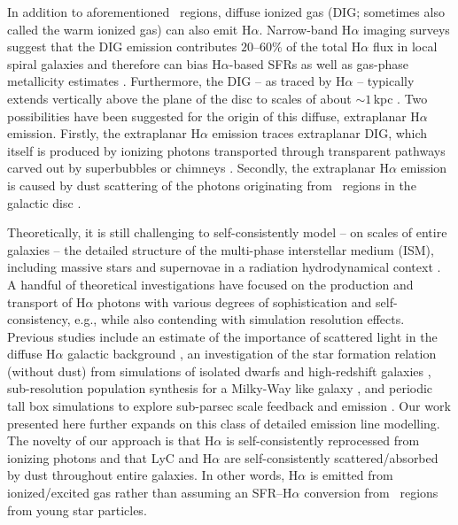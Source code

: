 \documentclass[fleqn,usenatbib]{mnras}
\newcommand\HII{\ion{H}{II}~} %
\begin{document}
In addition to aforementioned \HII regions, diffuse ionized gas (DIG; sometimes also called the warm ionized gas) can also emit H$\alpha$. Narrow-band H$\alpha$ imaging surveys suggest that the DIG emission contributes $20$--$60\%$ of the total H$\alpha$ flux in local spiral galaxies \citep{zurita00, oey07, kreckel16, chevance20} and therefore can bias H$\alpha$-based SFRs as well as gas-phase metallicity estimates \citep[e.g.,][]{sanders17, poetrodjojo19, vale-asari19}. Furthermore, the DIG -- as traced by H$\alpha$ -- typically extends vertically above the plane of the disc to scales of about $\sim1$\,kpc \citep{hoyle63, reynolds89, rand90, jo18, levy19}. Two possibilities have been suggested for the origin of this diffuse, extraplanar H$\alpha$ emission. Firstly, the extraplanar H$\alpha$ emission traces extraplanar DIG, which itself is produced by ionizing photons transported through transparent pathways carved out by superbubbles or chimneys \citep{mac-low99, veilleux05}. Secondly, the extraplanar H$\alpha$ emission is caused by dust scattering of the photons originating from \HII regions in the galactic disc \citep{reynolds90, ferrara96}.

Theoretically, it is still challenging to self-consistently model -- on scales of entire galaxies -- the detailed structure of the multi-phase interstellar medium (ISM), including massive stars and supernovae in a radiation hydrodynamical context \citep{rosdahl15, kannan20_mw, vogelsberger20_review}. A handful of theoretical investigations have focused on the production and transport of H$\alpha$ photons \citep[and similar emission lines, e.g.,][]{katz19, wilkins20} with various degrees of sophistication and self-consistency, e.g., while also contending with simulation resolution effects. Previous studies include an estimate of the importance of scattered light in the diffuse H$\alpha$ galactic background \citep{wood99, barnes15}, an investigation of the star formation relation (without dust) from simulations of isolated dwarfs and high-redshift galaxies \citep{kim13_sfr, kim19}, sub-resolution population synthesis for a Milky-Way like galaxy \citep{pellegrini20emp, pellegrini20}, and periodic tall box simulations to explore sub-parsec scale feedback and emission \citep{peters17, kado-fong20}. Our work presented here further expands on this class of detailed emission line modelling. The novelty of our approach is that H$\alpha$ is self-consistently reprocessed from ionizing photons and that LyC and H$\alpha$ are self-consistently scattered/absorbed by dust throughout entire galaxies. In other words, H$\alpha$ is emitted from ionized/excited gas rather than assuming an SFR--H$\alpha$ conversion from \HII regions from young star particles.
\end{document}
